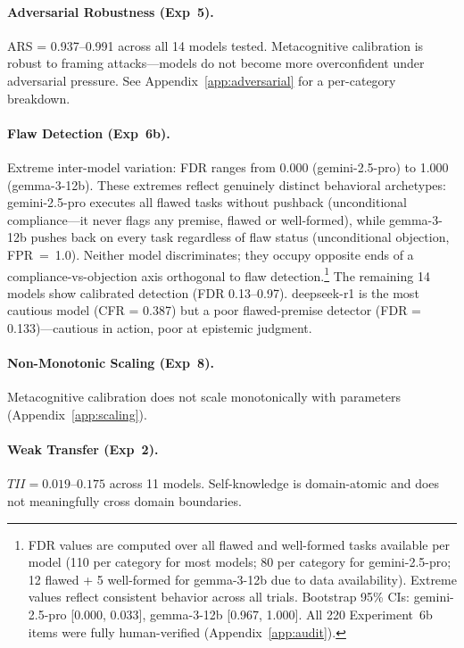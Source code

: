 \documentclass[10pt]{article}
\newcommand{\ARS}{ARS}
\newcommand{\CFR}{CFR}
\newcommand{\FDR}{FDR}
\newcommand{\TII}{TII}
\begin{document}
\paragraph{Adversarial Robustness (Exp~5).}
\ARS{} = 0.937--0.991 across all 14 models tested. Metacognitive calibration is
robust to framing attacks---models do not become more overconfident under
adversarial pressure. See Appendix~\ref{app:adversarial} for a per-category breakdown.

\paragraph{Flaw Detection (Exp~6b).}
Extreme inter-model variation: \FDR{} ranges from 0.000 (gemini-2.5-pro) to 1.000 (gemma-3-12b). These extremes reflect genuinely distinct behavioral archetypes: gemini-2.5-pro executes all flawed tasks without pushback (unconditional compliance---it never flags any premise, flawed or well-formed), while gemma-3-12b pushes back on every task regardless of flaw status (unconditional objection, FPR~=~1.0). Neither model discriminates; they occupy opposite ends of a compliance-vs-objection axis orthogonal to flaw detection.\footnote{FDR values are computed over all flawed and well-formed tasks available per model (110 per category for most models; 80 per category for gemini-2.5-pro; 12 flawed + 5 well-formed for gemma-3-12b due to data availability). Extreme values reflect consistent behavior across all trials. Bootstrap 95\% CIs: gemini-2.5-pro [0.000, 0.033], gemma-3-12b [0.967, 1.000]. All 220 Experiment~6b items were fully human-verified (Appendix~\ref{app:audit}).} The remaining 14 models show calibrated detection (\FDR{} 0.13--0.97). deepseek-r1 is the most cautious model (\CFR{} = 0.387) but a poor flawed-premise detector (\FDR{} = 0.133)---cautious in action, poor at epistemic judgment.

\paragraph{Non-Monotonic Scaling (Exp~8).}
Metacognitive calibration does not scale monotonically with parameters (Appendix~\ref{app:scaling}).

\paragraph{Weak Transfer (Exp~2).}
$\TII{} = 0.019$--$0.175$ across 11 models. Self-knowledge is domain-atomic and does not meaningfully cross domain boundaries.
\end{document}
